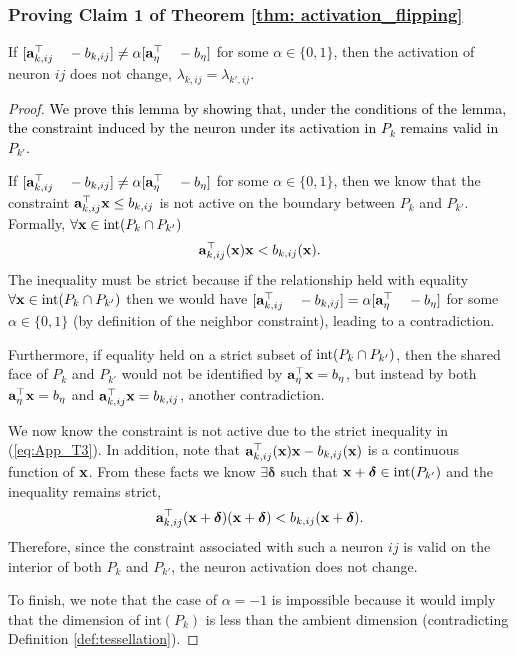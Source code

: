 \subsubsection{Proving Claim 1 of Theorem \ref{thm: activation_flipping}}
\begin{lemma} \label{lemma:stationary}
If $[\mathbf{a}_{k,ij}^\top\quad  -b_{k,ij}] \neq \alpha[\mathbf{a}_\eta^\top\quad -b_\eta]$ for some $\alpha \in \{0,1\}$, then the activation of neuron $ij$ does not change, $\lambda_{k,ij} = \lambda_{k',ij}$.
\end{lemma}
\begin{proof}
\textcolor{black}{We prove this lemma by showing that, under the conditions of the lemma, the constraint induced by the neuron under its activation in $P_k$ remains valid in $P_{k'}$.}

If $[\mathbf{a}_{k,ij}^\top\quad  -b_{k,ij}] \neq \alpha[\mathbf{a}_\eta^\top\quad -b_\eta]$ for some $\alpha \in \{0,1\}$, then we know that the constraint $\mathbf{a}_{k,ij}^\top \mathbf{x} \le  b_{k,ij}$ is not active on the boundary between $P_k$ and $P_{k'}$. Formally, $\forall \mathbf{x} \in \operatorname{int}(P_k \cap P_{k'})$
\begin{align}
    \mathbf{a}_{k,ij}^{\top}(\mathbf{x}) \mathbf{x} < b_{k,ij}(\mathbf{x}). \label{eq:App_T3}
\end{align}
The inequality must be strict because if the relationship held with equality $\forall \mathbf{x} \in \operatorname{int}(P_k \cap P_{k'})$ then we would have $[\mathbf{a}_{k,ij}^\top\quad  -b_{k,ij}] = \alpha[\mathbf{a}_\eta^\top\quad -b_\eta]$ for some $\alpha \in \{0,1\}$ (by definition of the neighbor constraint), leading to a contradiction.

Furthermore, if equality held on a strict subset of $\operatorname{int}(P_k \cap P_{k'})$, then the shared face of $P_k$ and $P_{k'}$ would not be identified by $\mathbf{a}_\eta^\top \mathbf{x} = b_\eta$, but instead by both $\mathbf{a}_\eta^\top \mathbf{x} = b_\eta$ and  $\mathbf{a}_{k,ij}^\top \mathbf{x} = b_{k,ij}$, another contradiction. 

We now know the constraint is not active due to the strict inequality in (\ref{eq:App_T3}).
In addition, note that $\mathbf{a}_{k,ij}^{\top}(\mathbf{x}) \mathbf{x} - b_{k,ij}(\mathbf{x})$ is a continuous function of $\mathbf{x}$. 
From these facts we know $\exists \bm{\delta}$ such that $\mathbf{x} + \bm{\delta} \in \operatorname{int}(P_{k'})$ and the inequality remains strict,
\begin{align}
    \mathbf{a}_{k,ij}^{\top}(\mathbf{x} + \bm{\delta}) (\mathbf{x} + \bm{\delta}) < b_{k,ij}(\mathbf{x} + \bm{\delta}). \label{eq:App_T12}
\end{align}
Therefore, since the constraint associated with such a neuron $ij$ is valid on the interior of both $P_k$ and $P_{k'}$, the neuron activation does not change.

To finish, we note that the case of $\alpha = -1$ is impossible because it would imply that the dimension of $\text{int}(P_k)$ is less than the ambient dimension (contradicting Definition \ref{def:tessellation}).
\end{proof}







